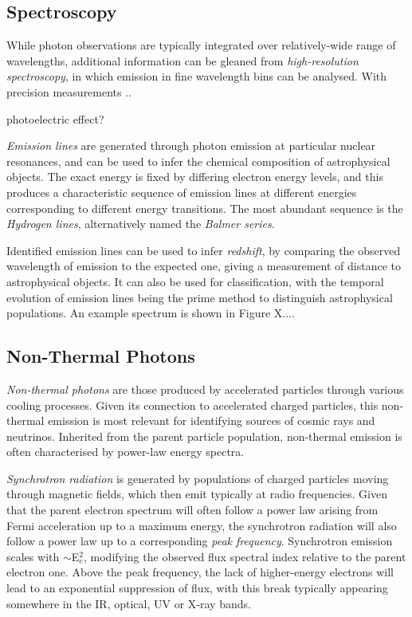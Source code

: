  \subsection*{Spectroscopy}

While photon observations are typically integrated over relatively-wide range of wavelengths, additional information can be gleaned from \emph{high-resolution spectroscopy}, in which emission in fine wavelength bins can be analysed. With precision measurements  ..

photoelectric effect?

\emph{Emission lines} are generated through photon emission at particular nuclear resonances, and can be used to infer the chemical composition of astrophysical objects. The exact energy is fixed by differing electron energy levels, and this produces a characteristic sequence of emission lines at different energies corresponding to different energy transitions. The most abundant sequence is the \emph{Hydrogen lines}, alternatively named the \emph{Balmer series}.

Identified emission lines can be used to infer \emph{redshift}, by comparing the observed wavelength of emission to the expected one, giving a measurement of distance to astrophysical objects. It can also be used for classification, with the temporal evolution of emission lines being the prime method to distinguish astrophysical populations. An example spectrum is shown in Figure X....

 \subsection*{Non-Thermal Photons}
 
\emph{Non-thermal photons} are those produced by accelerated particles through various cooling processes. Given its connection to accelerated charged particles, this non-thermal emission is most relevant for identifying sources of cosmic rays and neutrinos. Inherited from the parent particle population, non-thermal emission is often characterised by power-law energy spectra.

\emph{Synchrotron radiation} is generated by populations of charged particles moving through magnetic fields, which then emit typically at radio frequencies. Given that the parent electron spectrum will often follow a power law arising from Fermi acceleration up to a maximum energy, the synchrotron radiation will also follow a power law up to a corresponding \emph{peak frequency}. Synchrotron emission scales with $\sim$E$_{e}^{2}$, modifying the observed flux spectral index relative to the parent electron one. Above the peak frequency, the lack of higher-energy electrons will lead to an exponential suppression of flux, with this break typically appearing somewhere in the IR, optical, UV or X-ray bands.

